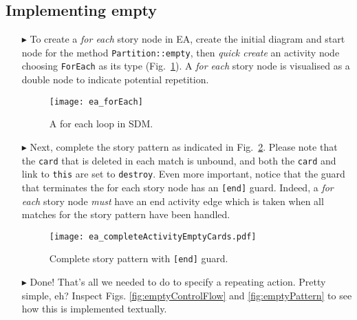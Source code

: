 \newpage
\subsection{Implementing empty}
\visHeader
\hypertarget{emptyPartition vis}{}

\begin{itemize}
\vspace{0.5cm}

\item[$\blacktriangleright$] To create a \emph{for each} story node in EA, create the initial diagram and start node for the method \texttt{Partition::empty},
then \emph{quick create} an activity node choosing \texttt{ForEach} as its type (Fig.~\ref{fig:sdm_foreach}). A \emph{for each} story node is visualised as a
double node to indicate potential repetition.

\vspace{1cm}

\begin{figure}[htbp]
\begin{center}
  \texttt{[image: ea\_forEach]}
  \caption{A for each loop in SDM.}  
  \label{fig:sdm_foreach}
\end{center}
\end{figure}

\vspace{1cm}

\item[$\blacktriangleright$] Next, complete the story pattern as indicated in Fig.~\ref{fig:sdm_end}. Please note that the \texttt{card} that is deleted in each match
is unbound, and both the \texttt{card} and link to \texttt{this} are set to \texttt{destroy}. Even more important, notice that the guard that terminates the for
each story node has an \texttt{[end]} guard. Indeed, a \emph{for each} story node \emph{must} have an end activity edge which is taken when all matches for the
story pattern have been handled.

\pagebreak

\begin{figure}[htbp]
\begin{center}
  \texttt{[image: ea\_completeActivityEmptyCards.pdf]}
  \caption{Complete story pattern with \texttt{[end]} guard.}  
  \label{fig:sdm_end}
\end{center}
\end{figure}

 \item[$\blacktriangleright$] Done! That's all we needed to do to specify a repeating
action. Pretty simple, eh? Inspect Figs. \ref{fig:emptyControlFlow} and \ref{fig:emptyPattern} to see how this is implemented textually.

\end{itemize}

